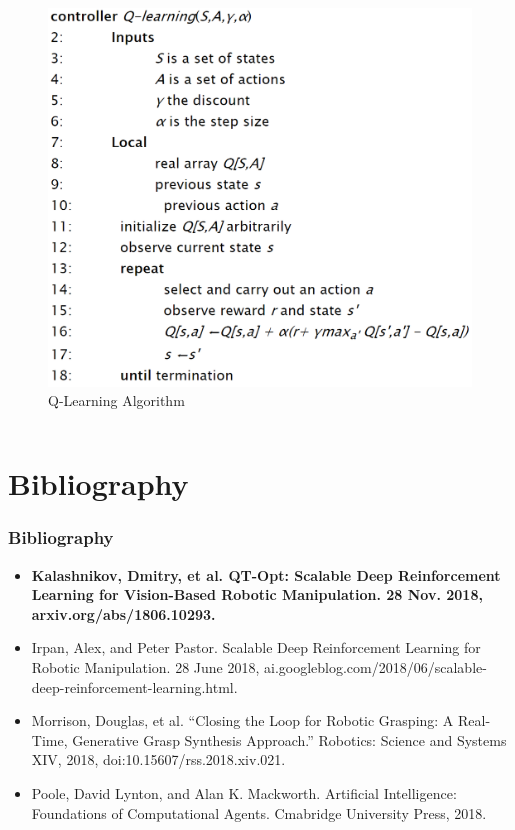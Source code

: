 \documentclass{beamer}
\newcommand{\refSec}{Bibliography}
\begin{document}
\begin{frame}
\begin{columns}[b]
           \begin{figure}
             \includegraphics[width=.9\linewidth]{Images/Q-Learning.png}
             \caption{Q-Learning Algorithm}
             \label{fig:QLearningAlgorithm}
           \end{figure}
      \end{columns}
    \end{frame}

  \section{\refSec}
    \begin{frame}[allowframebreaks]
      \frametitle{\refSec}
      \begin{itemize}
        \item \textbf{Kalashnikov, Dmitry, et al. QT-Opt: Scalable Deep Reinforcement Learning for Vision-Based Robotic Manipulation. 28 Nov. 2018, arxiv.org/abs/1806.10293.}
        \item Irpan, Alex, and Peter Pastor. Scalable Deep Reinforcement Learning for Robotic Manipulation. 28 June 2018, ai.googleblog.com/2018/06/scalable-deep-reinforcement-learning.html.
        \item Morrison, Douglas, et al. “Closing the Loop for Robotic Grasping: A Real-Time, Generative Grasp Synthesis Approach.” Robotics: Science and Systems XIV, 2018, doi:10.15607/rss.2018.xiv.021.
        \item Poole, David Lynton, and Alan K. Mackworth. Artificial Intelligence: Foundations of Computational Agents. Cmabridge University Press, 2018.
      \end{itemize}
    \end{frame}
\end{document}
